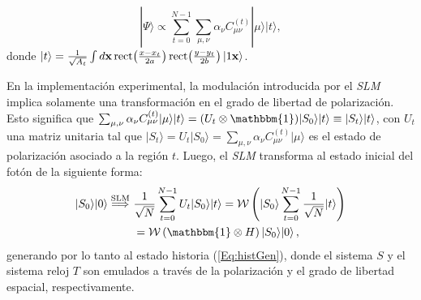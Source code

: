 
\begin{equation}
|\Psi\rangle\propto\sum_{t=0}^{N-1}\sum_{\mu,\nu}\alpha_\nu C_{\mu\nu}^{(t)}|\mu\rangle|t\rangle,\label{Psi_mod} 
\end{equation}
donde $|t\rangle=\frac{1}{\sqrt{A_t}}\int d\mathbf{x}\,{\rm rect}\!\left(\frac{x-x_t}{2a}\right){\rm rect}\!\left(\frac{y-y_t}{2b}\right)|1\mathbf{x}\rangle$. 

En la implementación experimental, la modulación introducida por el {\it SLM}
implica solamente una transformación en el grado de libertad de polarización. Esto significa que $\sum_{\mu,\nu}\alpha_\nu C_{\mu\nu}^{(t)}|\mu\rangle|t\rangle= (U_t\otimes\mathbbm{1})|S_0\rangle|t\rangle\equiv |S_t\rangle|t\rangle$, con $U_t$ 
una matriz unitaria tal que  $|S_t\rangle=U_t|S_0\rangle=\sum_{\mu,\nu}\alpha_\nu C_{\mu\nu}^{(t)}|\mu\rangle$ es el estado de polarización asociado a la región  $t$. Luego, el {\it SLM} transforma al estado inicial del fotón 
de la siguiente forma: 
\begin{equation}
\begin{split}
|S_0\rangle|0\rangle\stackrel{\rm{SLM}}{\Longrightarrow}~& \frac{1}{\sqrt{N}}\sum_{t=0}^{N-1}U_t|S_0\rangle|t\rangle={\cal W}\left(|S_0\rangle\sum_{t=0}^{N-1}\frac{1}{\sqrt{N}}|t\rangle\right)\\
&={\cal W}\left(\mathbbm{1}\otimes H\right)|S_0\rangle|0\rangle\,,
\end{split}
\end{equation}
generando por lo tanto  al estado historia (\ref{Eq:histGen}), donde el sistema $S$ 
y el sistema reloj $T$ son emulados a través de la polarización y el grado de libertad espacial, respectivamente.


